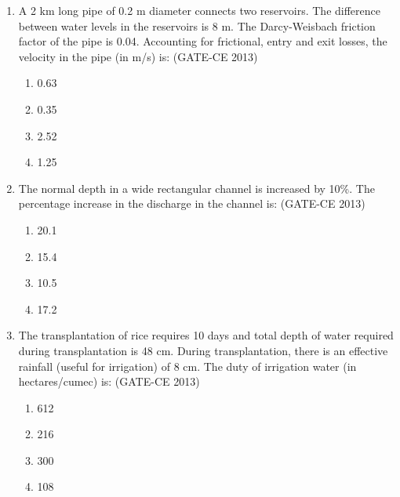 \documentclass[journal,12pt,onecolumn]{article}
\theoremstyle{remark}
\begin{document}
\begin{enumerate}
    \item A 2 km long pipe of 0.2 m diameter connects two reservoirs. The difference between water levels in the reservoirs is 8 m. The Darcy-Weisbach friction factor of the pipe is 0.04. Accounting for frictional, entry and exit losses, the velocity in the pipe (in m/s) is: (GATE-CE 2013)
    \begin{multicols}{4}
    \begin{enumerate}
        \item 0.63 
        \item 0.35 
        \item 2.52 
        \item 1.25
    \end{enumerate}
    \end{multicols}
    
    \item The normal depth in a wide rectangular channel is increased by 10\%. The percentage increase in the discharge in the channel is: (GATE-CE 2013)
    \begin{multicols}{4}
    \begin{enumerate}
        \item 20.1 
        \item 15.4 
        \item 10.5 
        \item 17.2
    \end{enumerate}
    \end{multicols}
    
    \item The transplantation of rice requires 10 days and total depth of water required during transplantation is 48 cm. During transplantation, there is an effective rainfall (useful for irrigation) of 8 cm. The duty of irrigation water (in hectares/cumec) is: (GATE-CE 2013)
    \begin{multicols}{4}
    \begin{enumerate}
        \item 612 
        \item 216 
        \item 300 
        \item 108
    \end{enumerate}
    \end{multicols}
    

\end{enumerate}
\end{document}

